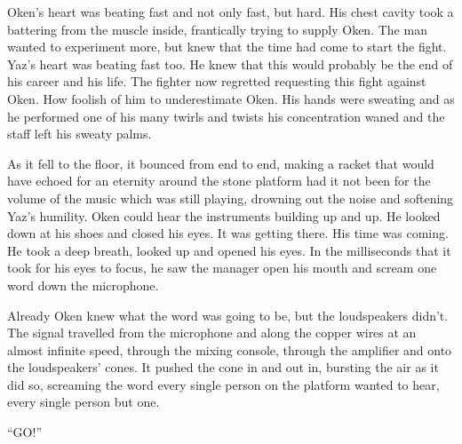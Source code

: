 Oken's heart was beating fast and not only fast, but hard. His chest cavity took a battering from the muscle inside, frantically trying to supply Oken. The man wanted to experiment more, but knew that the time had come to start the fight. Yaz's heart was beating fast too. He knew that this would probably be the end of his career and his life. The fighter now regretted requesting this fight against Oken. How foolish of him to underestimate Oken. His hands were sweating and as he performed one of his many twirls and twists his concentration waned and the staff left his sweaty palms.

As it fell to the floor, it bounced from end to end, making a racket that would have echoed for an eternity around the stone platform had it not been for the volume of the music which was still playing, drowning out the noise and softening Yaz's humility. Oken could hear the instruments building up and up. He looked down at his shoes and closed his eyes. It was getting there. His time was coming. He took a deep breath, looked up and opened his eyes. In the milliseconds that it took for his eyes to focus, he saw the manager open his mouth and scream one word down the microphone.

Already Oken knew what the word was going to be, but the loudspeakers didn't. The signal travelled from the microphone and along the copper wires at an almost infinite speed, through the mixing console, through the amplifier and onto the loudspeakers' cones. It pushed the cone in and out in, bursting the air as it did so, screaming the word every single person on the platform wanted to hear, every single person but one.

``GO!''
